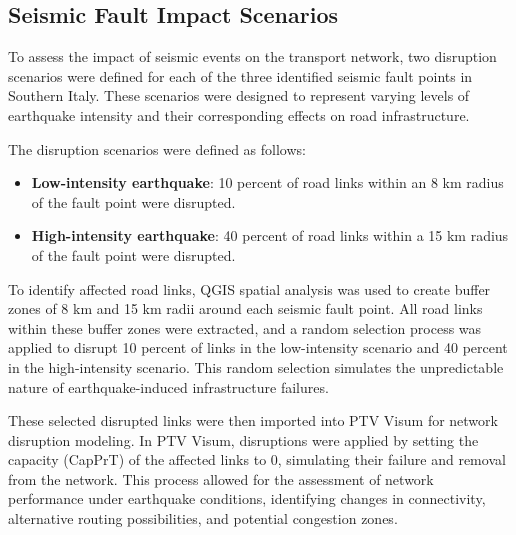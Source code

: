 \subsection{Seismic Fault Impact Scenarios}

To assess the impact of seismic events on the transport network, two disruption scenarios were defined for each of the three identified seismic fault points in Southern Italy. These scenarios were designed to represent varying levels of earthquake intensity and their corresponding effects on road infrastructure.

The disruption scenarios were defined as follows:
\begin{itemize}
    \item \textbf{Low-intensity earthquake}: 10 percent of road links within an 8 km radius of the fault point were disrupted.
    \item \textbf{High-intensity earthquake}: 40 percent of road links within a 15 km radius of the fault point were disrupted.
\end{itemize}

To identify affected road links, QGIS spatial analysis was used to create buffer zones of 8 km and 15 km radii around each seismic fault point. All road links within these buffer zones were extracted, and a random selection process was applied to disrupt 10 percent of links in the low-intensity scenario and 40 percent in the high-intensity scenario. This random selection simulates the unpredictable nature of earthquake-induced infrastructure failures.

These selected disrupted links were then imported into PTV Visum for network disruption modeling. In PTV Visum, disruptions were applied by setting the capacity (CapPrT) of the affected links to 0, simulating their failure and removal from the network. This process allowed for the assessment of network performance under earthquake conditions, identifying changes in connectivity, alternative routing possibilities, and potential congestion zones.


